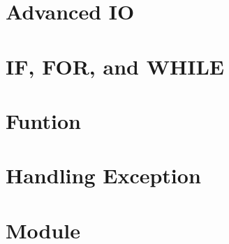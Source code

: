\documentclass{beamer}
\begin{document}
	\section{Advanced IO}
	
	\section{IF, FOR, and WHILE}

	\section{Funtion}
	
	\section{Handling Exception}
	
	\section{Module}
\end{document}
